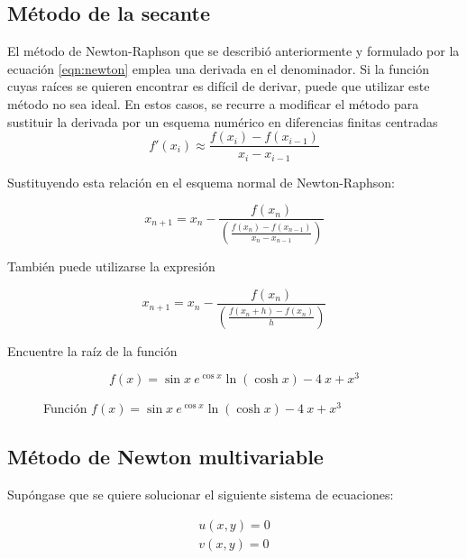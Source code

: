 \subsection{Método de la secante}

El método de Newton-Raphson que se describió anteriormente y formulado por la
ecuación \ref{eqn:newton} emplea una derivada en el denominador. Si la función
cuyas raíces se quieren encontrar es difícil de derivar, puede que utilizar este
método no sea ideal. En estos casos, se recurre a modificar el método para
sustituir la derivada por un esquema numérico en diferencias finitas centradas
\[
    f'(x_i) \approx \frac{f(x_i) - f(x_{i-1})}{x_i - x_{i-1}}
\]

Sustituyendo esta relación en el esquema normal de Newton-Raphson:

\begin{equation}\label{eqn:secante}
    \boxed{x_{n+1} = x_n - \frac{f(x_n)}{ \left( \frac{f(x_n) - f(x_{n-1})}{x_n - x_{n-1}} \right)}}
\end{equation}

También puede utilizarse la expresión

\begin{equation}\label{eqn:secante-2}
    \boxed{x_{n+1} = x_n - \frac{f(x_n)}{ \left( \frac{f(x_n + h) - f(x_n)}{h} \right)}}
\end{equation}


\begin{ex}
    Encuentre la raíz de la función

    \[
        f(x) = \sin x\ e^{\cos x} \ln(\cosh x) - 4\ x + x^3
    \]

    \begin{figure}
        \centering
        \caption{Función $f(x) = \sin x\ e^{\cos x} \ln(\cosh x) - 4\ x + x^3$}
        \label{fig:ejercicio-secante}
    \end{figure}


\end{ex}

\subsection{Método de Newton multivariable}

Supóngase que se quiere solucionar el siguiente sistema de ecuaciones:

\begin{align*}
    u(x,y) = 0 \\
    v(x,y) = 0
\end{align*}
